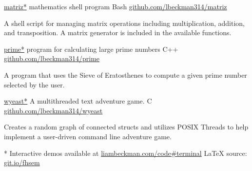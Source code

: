 \myBreak

\showoff
{\href{https://liambeckman.com/code/matriz}{matriz*}}
{mathematics shell program}
{Bash}
{\href{https://github.com/lbeckman314/matriz}{github.com/lbeckman314/matriz}}

A shell script for managing matrix operations including multiplication, addition, and transposition. A matrix generator is included in the available functions.

\myBreak

\showoff
{\href{https://liambeckman.com/code/matriz}{prime*}}
{program for calculating large prime numbers}
{C++}
{\href{https://github.com/lbeckman314/prime}{github.com/lbeckman314/prime}}

A program that uses the Sieve of Eratosthenes to compute a given prime number selected by the user.

\myBreak

\showoff
{\href{https://liambeckman.com/code/wyeast}{wyeast*}}
{A multithreaded text adventure game.}
{C}
{\href{https://github.com/lbeckman314/wyeast}{github.com/lbeckman314/wyeast}}

Creates a random graph of connected structs and utilizes POSIX Threads to help implement a user-driven command line adventure game.


\vfill
* Interactive demos available at \textcolor{my-blue}{\href{https://liambeckman.com/code\#terminal}{liambeckman.com/code\#terminal}}
\hfill\textcolor{my-red}{\LaTeX{} source: \href{https://git.io/fhsem}{git.io/fhsem}}


